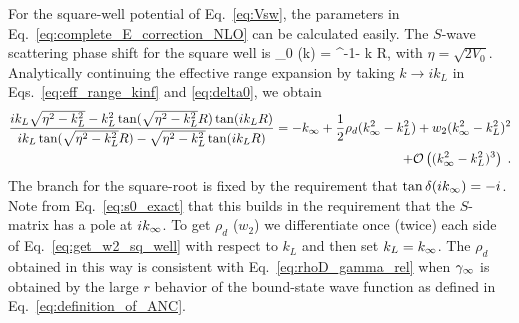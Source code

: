 	For the square-well potential of Eq.~\eqref{eq:Vsw}, the parameters in
	Eq.~\eqref{eq:complete_E_correction_NLO} can be calculated easily.
	The $S$-wave scattering phase shift for	the square well is
	\beq
	 \delta_0 (k) =
	  \tan^{-1} - k R\;,
	  \label{eq:delta0}
	\eeq
	with $\eta = \sqrt{2 V_0}$. 	Analytically continuing the effective
	range expansion by taking $k \rightarrow i k_L$
	in Eqs.~\eqref{eq:eff_range_kinf} and \eqref{eq:delta0}, we obtain
  \begin{align}
	{i k_L \sqrt{\eta^2 - k_L^2} -k_L^2 \tan( \sqrt{\eta^2 - k_L^2} R)
	\tan(i k_L R) \over i k_L \tan(\sqrt{\eta^2 - k_L^2} R) -
	\sqrt{\eta^2 - k_L^2} \tan(i k_L R) }
	= -k_{\infty}
	+ \frac12{\rho_d} (k_{\infty}^2-k_L^2) + w_2 (k_{\infty}^2 - k_L^2)^2
	\nonumber \\
	+ \mathcal{O}\left((k_{\infty}^2-k_L^2)^3\right)	\;.
	\label{eq:get_w2_sq_well}
\end{align}
	The branch for the square-root is fixed by the requirement that
	$\tan \delta (ik_{\infty}) = -i$.  Note from Eq.~\eqref{eq:s0_exact} that
	this builds in the requirement that the $S$-matrix has a pole at
	$i k_{\infty}$.  To get $\rho_d$ ($w_2$) we differentiate once (twice) each
	side of Eq.~\eqref{eq:get_w2_sq_well} with
	respect to $k_L$ and then set $k_L = k_{\infty}$.  The $\rho_d$ obtained in
	this way is consistent with Eq.~\eqref{eq:rhoD_gamma_rel} when $\gamma_\infty$
	is obtained by the large $r$ behavior of the bound-state wave function
	as defined in Eq.~\eqref{eq:definition_of_ANC}.


